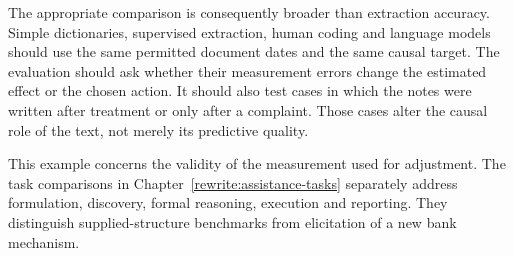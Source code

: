 The appropriate comparison is consequently broader than extraction accuracy.
Simple dictionaries, supervised extraction, human coding and language models
should use the same permitted document dates and the same causal target.
The evaluation should ask whether their measurement errors change the estimated
effect or the chosen action. It should also test cases in which the notes were
written after treatment or only after a complaint. Those cases alter the
causal role of the text, not merely its predictive quality.
\citep{exec13_census_text_review_arxiv}

This example concerns the validity of the measurement used for adjustment.
The task comparisons in Chapter~\ref{rewrite:assistance-tasks} separately
address formulation, discovery, formal reasoning, execution and reporting.
They distinguish supplied-structure benchmarks from elicitation of a new
bank mechanism. \citep{v12_la_2312_04350,v12_la_2606_23608}
